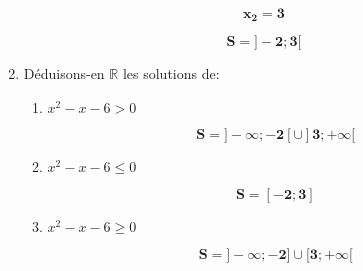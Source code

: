 \documentclass[a4paper,12pt]{article}
\begin{document}
\begin{enumerate}
\begin{resultbox}
    \[
    \mathbf{x_2 = 3}
    \]
\end{resultbox}

                    \begin{center}
                    \end{center}
\begin{resultbox}
    \[
    \mathbf{S = ]-2;3[}
    \]
\end{resultbox}

\item Déduisons-en \(\mathbb{R}\) les solutions de:
\begin{enumerate}
    \item \( x^2 - x - 6 > 0 \)
    \begin{resultbox}
    \[
    \mathbf{S = ]-\infty;-2[ \cup ]3;+\infty[}
    \]
    \end{resultbox}
    \item \( x^2 - x - 6 \leq 0 \)
\begin{resultbox}
    \[
    \mathbf{S = [-2;3]}
    \]
\end{resultbox}
    \item \( x^2 - x - 6 \geq 0 \)
    \begin{resultbox}
    \[
    \mathbf{S = ]-\infty;-2] \cup [3;+\infty[}
    \]
    \end{resultbox}
\end{enumerate}
\end{enumerate}
\end{document}
